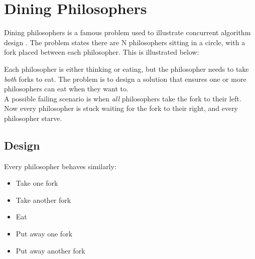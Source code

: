 % 

\chapter{Dining Philosophers}

Dining philosophers is a famous problem used to illustrate concurrent algorithm
design \cite{dining}. The problem states there are N philosophers sitting in a
circle, with a fork placed between each philosopher. This is illustrated
below:\\

\begin{center}
\end{center}

Each philosopher is either thinking or eating, but the philosopher needs to take
\textit{both} forks to eat. The problem is to design a solution that ensures one
or more philosophers can eat when they want to. \\

A possible failing scenario is when \textit{all} philosophers take the fork to
their left. Now every philosopher is stuck waiting for the fork to their right, 
and every philosopher starve.

\section{Design}

Every philosopher behaves similarly:
\begin{itemize}
    \item Take one fork 
    \item Take another fork 
    \item Eat
    \item Put away one fork
    \item Put away another fork
\end{itemize}

